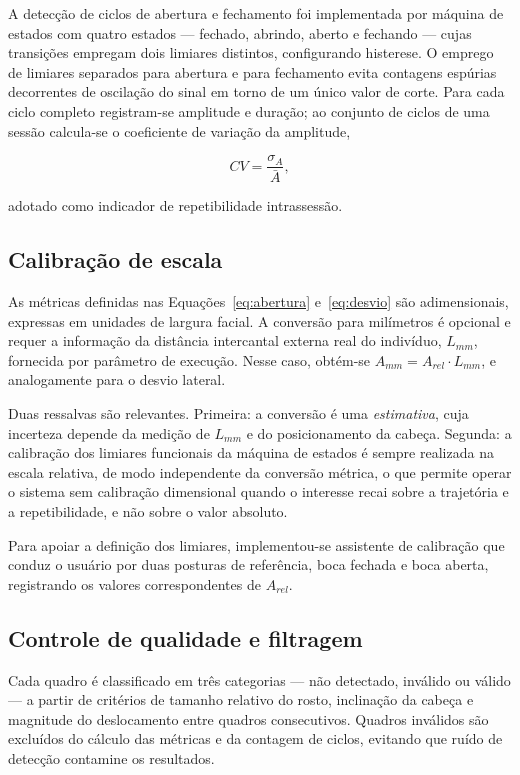 \documentclass[
    article,
    11pt,
    oneside,
    a4paper,
    english,
    brazil
]{abntex2}
\begin{document}
A detecção de ciclos de abertura e fechamento foi implementada por máquina
de estados com quatro estados --- fechado, abrindo, aberto e fechando ---
cujas transições empregam dois limiares distintos, configurando histerese.
O emprego de limiares separados para abertura e para fechamento evita
contagens espúrias decorrentes de oscilação do sinal em torno de um único
valor de corte. Para cada ciclo completo registram-se amplitude e duração;
ao conjunto de ciclos de uma sessão calcula-se o coeficiente de variação da
amplitude,

\begin{equation}
    CV = \frac{\sigma_{A}}{\bar{A}} ,
    \label{eq:cv}
\end{equation}

\noindent
adotado como indicador de repetibilidade intrassessão.

\subsection{Calibração de escala}
\label{sec:calibracao}

As métricas definidas nas Equações~\eqref{eq:abertura} e~\eqref{eq:desvio}
são adimensionais, expressas em unidades de largura facial. A conversão para
milímetros é opcional e requer a informação da distância intercantal externa
real do indivíduo, $L_{mm}$, fornecida por parâmetro de execução. Nesse
caso, obtém-se $A_{mm} = A_{rel} \cdot L_{mm}$, e analogamente para o desvio
lateral.

Duas ressalvas são relevantes. Primeira: a conversão é uma
\textit{estimativa}, cuja incerteza depende da medição de $L_{mm}$ e do
posicionamento da cabeça. Segunda: a calibração dos limiares funcionais da
máquina de estados é sempre realizada na escala relativa, de modo
independente da conversão métrica, o que permite operar o sistema sem
calibração dimensional quando o interesse recai sobre a trajetória e a
repetibilidade, e não sobre o valor absoluto.

Para apoiar a definição dos limiares, implementou-se assistente de
calibração que conduz o usuário por duas posturas de referência, boca
fechada e boca aberta, registrando os valores correspondentes de
$A_{rel}$.

\subsection{Controle de qualidade e filtragem}

Cada quadro é classificado em três categorias --- não detectado, inválido ou
válido --- a partir de critérios de tamanho relativo do rosto, inclinação da
cabeça e magnitude do deslocamento entre quadros consecutivos. Quadros
inválidos são excluídos do cálculo das métricas e da contagem de ciclos,
evitando que ruído de detecção contamine os resultados.
\end{document}
